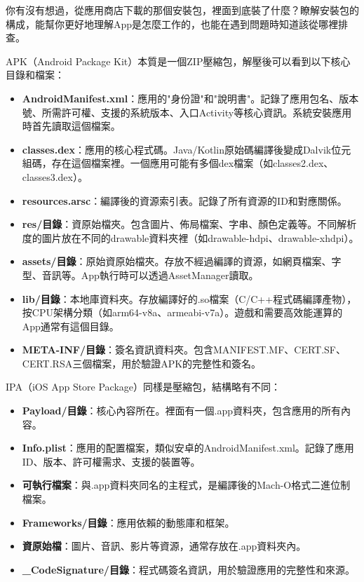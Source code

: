 
你有沒有想過，從應用商店下載的那個安裝包，裡面到底裝了什麼？瞭解安裝包的構成，能幫你更好地理解App是怎麼工作的，也能在遇到問題時知道該從哪裡排查。


APK（Android Package Kit）本質是一個ZIP壓縮包，解壓後可以看到以下核心目錄和檔案：

\begin{itemize}
  \item \textbf{AndroidManifest.xml}：應用的"身份證"和"說明書"。記錄了應用包名、版本號、所需許可權、支援的系統版本、入口Activity等核心資訊。系統安裝應用時首先讀取這個檔案。
  \item \textbf{classes.dex}：應用的核心程式碼。Java/Kotlin原始碼編譯後變成Dalvik位元組碼，存在這個檔案裡。一個應用可能有多個dex檔案（如classes2.dex、classes3.dex）。
  \item \textbf{resources.arsc}：編譯後的資源索引表。記錄了所有資源的ID和對應關係。
  \item \textbf{res/目錄}：資原始檔夾。包含圖片、佈局檔案、字串、顏色定義等。不同解析度的圖片放在不同的drawable資料夾裡（如drawable-hdpi、drawable-xhdpi）。
  \item \textbf{assets/目錄}：原始資原始檔夾。存放不經過編譯的資源，如網頁檔案、字型、音訊等。App執行時可以透過AssetManager讀取。
  \item \textbf{lib/目錄}：本地庫資料夾。存放編譯好的.so檔案（C/C++程式碼編譯產物），按CPU架構分類（如arm64-v8a、armeabi-v7a）。遊戲和需要高效能運算的App通常有這個目錄。
  \item \textbf{META-INF/目錄}：簽名資訊資料夾。包含MANIFEST.MF、CERT.SF、CERT.RSA三個檔案，用於驗證APK的完整性和簽名。
\end{itemize}


IPA（iOS App Store Package）同樣是壓縮包，結構略有不同：

\begin{itemize}
  \item \textbf{Payload/目錄}：核心內容所在。裡面有一個.app資料夾，包含應用的所有內容。
  \item \textbf{Info.plist}：應用的配置檔案，類似安卓的AndroidManifest.xml。記錄了應用ID、版本、許可權需求、支援的裝置等。
  \item \textbf{可執行檔案}：與.app資料夾同名的主程式，是編譯後的Mach-O格式二進位制檔案。
  \item \textbf{Frameworks/目錄}：應用依賴的動態庫和框架。
  \item \textbf{資原始檔}：圖片、音訊、影片等資源，通常存放在.app資料夾內。
  \item \textbf{\_CodeSignature/目錄}：程式碼簽名資訊，用於驗證應用的完整性和來源。
\end{itemize}


